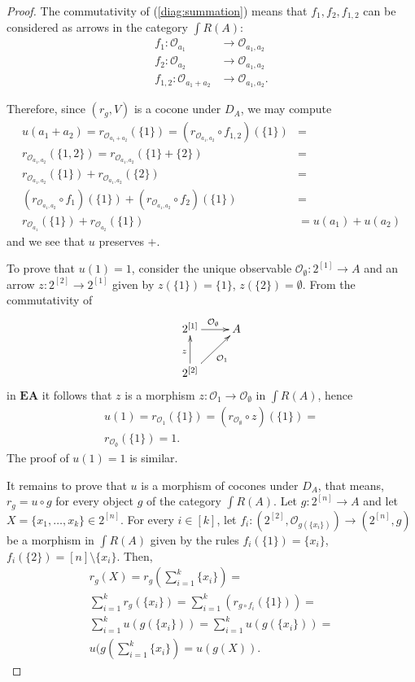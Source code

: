 \documentclass[smallextended]{svjour3}
\begin{document}
\begin{proof}
The commutativity of (\ref{diag:summation}) means that $f_1,f_2,f_{1,2}$
can be considered as arrows in the category ${\int R({A})}$:
\begin{align*}
f_1\colon{\mathcal O_{{a_1}}}&\to{\mathcal O_{{a_1,a_2}}}\\
f_2\colon{\mathcal O_{{a_2}}}&\to{\mathcal O_{{a_1,a_2}}}\\
f_{1,2}\colon{\mathcal O_{{a_1+a_2}}}&\to{\mathcal O_{{a_1,a_2}}}.
\end{align*}

Therefore, since $(r_g,V)$ is a cocone under $D_A$, we may compute
\begin{align*}
u(a_1+a_2)=
r_{{\mathcal O_{{a_1+a_2}}}}(\{1\})=
(r_{{\mathcal O_{{a_1,a_2}}}}\circ f_{1,2})(\{1\})&=\\
r_{{\mathcal O_{{a_1,a_2}}}}(\{1,2\})=r_{{\mathcal O_{{a_1,a_2}}}}(\{1\}+\{2\})&=\\
r_{{\mathcal O_{{a_1,a_2}}}}(\{1\})+r_{{\mathcal O_{{a_1,a_2}}}}(\{2\})&=\\
(r_{{\mathcal O_{{a_1,a_2}}}}\circ f_1)(\{1\})+(r_{{\mathcal O_{{a_1,a_2}}}}\circ f_2)(\{1\})&=\\
r_{{\mathcal O_{{a_1}}}}(\{1\})+r_{{\mathcal O_{{a_2}}}}(\{1\})&=u(a_1)+u(a_2)
\end{align*}
and we see that $u$ preserves $+$.

To prove that $u(1)=1$, consider the unique observable ${\mathcal O_{{\emptyset}}}:2^{[1]}\to A$ and
an arrow $z:2^{[2]}\to 2^{[1]}$ 
given by $z(\{1\})=\{1\}$, $z(\{2\})=\emptyset$. From the commutativity of
$$
\xymatrix{
2^{[1]}
	\ar[r]^{{\mathcal O_{{\emptyset}}}}
&
A
\\
2^{[2]}
	\ar[u]^{z}
	\ar[ru]_{{\mathcal O_{{1}}}}
}
$$
in ${\mathbf{EA}}$ it follows that
$z$ is a morphism
$z:{\mathcal O_{{1}}}\to {\mathcal O_{{\emptyset}}}$ in ${\int R({A})}$, hence 
\begin{align*}
u(1)=r_{{\mathcal O_{{1}}}}(\{1\})=(r_{{\mathcal O_{{\emptyset}}}}\circ z)(\{1\})=\\
r_{{\mathcal O_{{\emptyset}}}}(\{1\})=1.
\end{align*}
The proof of $u(1)=1$ is similar.

It remains to prove that  
$u$ 
is a morphism of cocones under $D_A$, that means,
$r_{g}=u\circ g$ 
for every object $g$ of the category ${\int R({A})}$.
Let $g:2^{[n]}\to A$ and let $X=\{x_1,\dots,x_k\}\in 2^{[n]}$.
For every $i\in[k]$, let $f_i:(2^{[2]},{\mathcal O_{{g(\{x_i\})}}})\to (2^{[n]},g)$ be
a morphism in ${\int R({A})}$ given by the rules $f_i(\{1\})=\{x_i\}$,
$f_i(\{2\})=[n]\setminus\{x_i\}$. Then,
\begin{align*}
r_{g}(X)=r_{g}(\sum_{i=1}^k\{x_i\})=\\
\sum_{i=1}^k r_{g}(\{x_i\})=
\sum_{i=1}^k(r_{g\circ f_i}(\{1\}))=\\
\sum_{i=1}^k u(g(\{x_i\}))=
\sum_{i=1}^k u(g(\{x_i\}))=\\
u(g(\sum_{i=1}^k\{x_i\})=u(g(X)).
\end{align*}
\end{proof}
\end{document}
